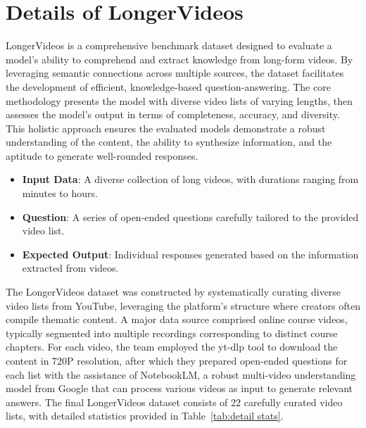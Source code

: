 \appendix
\clearpage
\section{Details of LongerVideos}\label{apd:data}
LongerVideos is a comprehensive benchmark dataset designed to evaluate a model's ability to comprehend and extract knowledge from long-form videos. By leveraging semantic connections across multiple sources, the dataset facilitates the development of efficient, knowledge-based question-answering. The core methodology presents the model with diverse video lists of varying lengths, then assesses the model's output in terms of completeness, accuracy, and diversity. This holistic approach ensures the evaluated models demonstrate a robust understanding of the content, the ability to synthesize information, and the aptitude to generate well-rounded responses.
\vspace{-0.05in}
\begin{itemize}[leftmargin=*]
    \item \textbf{Input Data}: A diverse collection of long videos, with durations ranging from minutes to hours.
    \item \textbf{Question}: A series of open-ended questions carefully tailored to the provided video list.
    \item \textbf{Expected Output}: Individual responses generated based on the information extracted from videos.
\end{itemize}
\vspace{-0.05in}
The LongerVideos dataset was constructed by systematically curating diverse video lists from YouTube, leveraging the platform's structure where creators often compile thematic content. A major data source comprised online course videos, typically segmented into multiple recordings corresponding to distinct course chapters. For each video, the team employed the yt-dlp tool to download the content in 720P resolution, after which they prepared open-ended questions for each list with the assistance of NotebookLM, a robust multi-video understanding model from Google that can process various videos as input to generate relevant answers. The final LongerVideos dataset consists of 22 carefully curated video lists, with detailed statistics provided in Table~\ref{tab:detail stats}.
